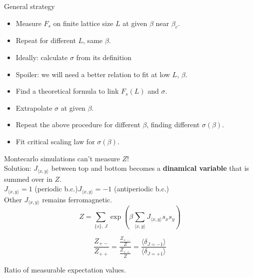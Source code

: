 \documentclass[12pt,handout]{beamer}
\begin{document}
\begin{frame}{General strategy}
\begin{center}
\begin{itemize}
\item Measure $F_s$ on finite lattice size $L$ at given $\beta$ near $\beta_c$.
\item Repeat for different $L$, same $\beta$.
\item Ideally: calculate $\sigma$ from its definition
\item Spoiler: we will need a better relation to fit at low $L$, $\beta$.
\item Find a theoretical formula to link $F_s(L)$ and $\sigma$.
\item Extrapolate $\sigma$ at given $\beta$.
\item Repeat the above procedure for different $\beta$, finding different $\sigma \left(\beta \right)$.
\item Fit critical scaling law for $\sigma\left(\beta \right)$.
\end{itemize}
\end{center}
\end{frame}


\begin{frame}
\begin{center}
{\Large Montecarlo simulations can't measure $Z$!\\}
\vspace{10pt}
Solution: $J_{\langle x, y \rangle}$ between top and bottom becomes a \textbf{dinamical variable} that is summed over in $Z$.\\
$J_{\langle x, y \rangle} = 1$ (periodic b.c.)\hspace{10pt}$J_{\langle x, y \rangle} = -1$ (antiperiodic b.c.)\\
Other $J_{\langle x, y \rangle}$ remains ferromagnetic.
\[
Z = \sum_{\lbrace s \rbrace, \, J} \exp \left( \beta \sum_{\langle x, y \rangle} J_{\langle x, y \rangle} s_x s_y \right)
\]

{\large \[
\frac{Z_{+-}}{Z_{++}} = \frac{\frac{Z_{+-}}{Z}}{\frac{Z_{++}}{Z}}=\frac{\langle \delta_{J = -1} \rangle}{\langle \delta_{J = + 1} \rangle}
\]}

Ratio of measurable expectation values.
\end{center}
\end{frame}
\end{document}
